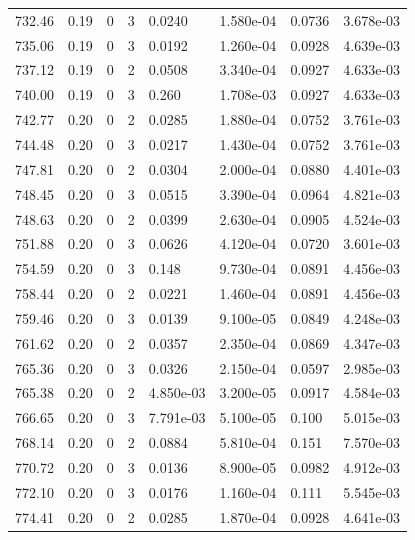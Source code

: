 \documentclass[preview]{standalone}
\begin{document}
{{{{{{{{{{{\begin{tabular}{L{1.2cm}C{1.2cm} C{0.3cm}C{0.5cm} C{1.4cm}C{1.4cm} C{1.4cm}C{1.4cm}}
  732.46  &  0.19  & 0     &  3 &  0.0240  & 1.580e-04  & 0.0736 &  3.678e-03   \\ 
  735.06  &  0.19  & 0     &  3 &  0.0192  & 1.260e-04  & 0.0928 &  4.639e-03   \\ 
  737.12  &  0.19  & 0     &  2 &  0.0508  & 3.340e-04  & 0.0927 &  4.633e-03   \\ 
  740.00  &  0.19  & 0     &  3 &  0.260  & 1.708e-03  & 0.0927 &  4.633e-03   \\ 
  742.77  &  0.20  & 0     &  2 &  0.0285  & 1.880e-04  & 0.0752 &  3.761e-03   \\ 
  744.48  &  0.20  & 0     &  3 &  0.0217  & 1.430e-04  & 0.0752 &  3.761e-03   \\ 
  747.81  &  0.20  & 0     &  2 &  0.0304  & 2.000e-04  & 0.0880 &  4.401e-03   \\ 
  748.45  &  0.20  & 0     &  3 &  0.0515  & 3.390e-04  & 0.0964 &  4.821e-03   \\ 
  748.63  &  0.20  & 0     &  2 &  0.0399  & 2.630e-04  & 0.0905 &  4.524e-03   \\ 
  751.88  &  0.20  & 0     &  3 &  0.0626  & 4.120e-04  & 0.0720 &  3.601e-03   \\ 
  754.59  &  0.20  & 0     &  3 &  0.148  & 9.730e-04  & 0.0891 &  4.456e-03   \\ 
  758.44  &  0.20  & 0     &  2 &  0.0221  & 1.460e-04  & 0.0891 &  4.456e-03   \\ 
  759.46  &  0.20  & 0     &  3 &  0.0139  & 9.100e-05  & 0.0849 &  4.248e-03   \\ 
  761.62  &  0.20  & 0     &  2 &  0.0357  & 2.350e-04  & 0.0869 &  4.347e-03   \\ 
  765.36  &  0.20  & 0     &  3 &  0.0326  & 2.150e-04  & 0.0597 &  2.985e-03   \\ 
  765.38  &  0.20  & 0     &  2 &  4.850e-03  & 3.200e-05  & 0.0917 &  4.584e-03   \\ 
  766.65  &  0.20  & 0     &  3 &  7.791e-03  & 5.100e-05  & 0.100 &  5.015e-03   \\ 
  768.14  &  0.20  & 0     &  2 &  0.0884  & 5.810e-04  & 0.151 &  7.570e-03   \\ 
  770.72  &  0.20  & 0     &  3 &  0.0136  & 8.900e-05  & 0.0982 &  4.912e-03   \\ 
  772.10  &  0.20  & 0     &  3 &  0.0176  & 1.160e-04  & 0.111 &  5.545e-03   \\ 
  774.41  &  0.20  & 0     &  2 &  0.0285  & 1.870e-04  & 0.0928 &  4.641e-03   \\ 

\end{tabular}}}}}}}}}}}}
\end{document}
